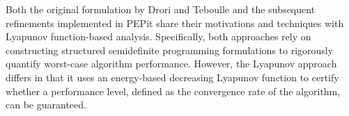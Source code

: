 Both the original formulation by Drori and Teboulle and the subsequent refinements implemented in PEPit share their motivations and techniques with Lyapunov function-based analysis. Specifically, both approaches rely on constructing structured semidefinite programming formulations to rigorously quantify worst-case algorithm performance. However, the Lyapunov approach differs in that it uses an energy-based decreasing Lyapunov function to certify whether a performance level, defined as the convergence rate of the algorithm, can be guaranteed. 



